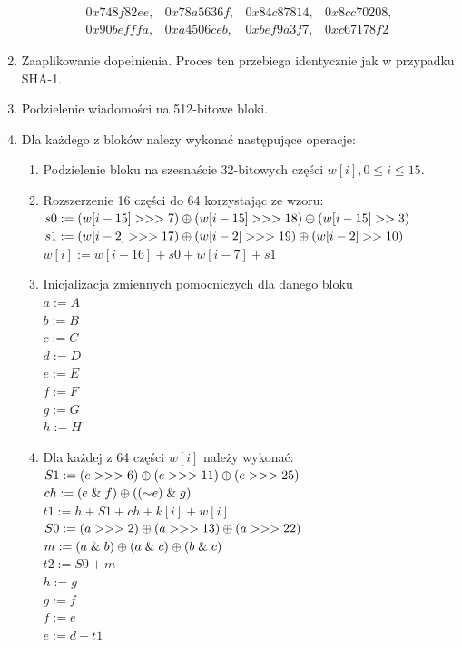 \begin{enumerate}
$$\begin{matrix}
				0x748f82ee, & 0x78a5636f, & 0x84c87814, & 0x8cc70208, \\
				0x90befffa, & 0xa4506ceb, & 0xbef9a3f7, & 0xc67178f2  	
			\end{matrix}
			$$
	\item Zaaplikowanie dopełnienia. Proces ten przebiega identycznie jak w przypadku SHA-1.
	\item Podzielenie wiadomości na 512-bitowe bloki.
	\item Dla każdego z bloków należy wykonać następujące operacje:
		\begin{enumerate}
			\item Podzielenie bloku na szesnaście 32-bitowych części $w[i], 0 \leq i \leq 15$.
			\item Rozszerzenie 16 części do 64 korzystając ze wzoru: \\
				$s0 := (w[i-15] >>> 7) \mathbin{\oplus} (w[i-15] >>> 18) \mathbin{\oplus} (w[i-15] >> 3)$ \\
			    $s1 := (w[i-2] >>> 17) \mathbin{\oplus} (w[i-2] >>> 19) \mathbin{\oplus} (w[i-2] >> 10)$ \\
				$w[i] := w[i-16] + s0 + w[i-7] + s1$
			\item Inicjalizacja zmiennych pomocniczych dla danego bloku \\
				$a := A$ \\
				$b := B$ \\
				$c := C$ \\
				$d := D$ \\
				$e := E$ \\
				$f := F$ \\
				$g := G$ \\
				$h := H$
			\item Dla każdej z 64 części $w[i]$ należy wykonać: \\
				$S1 := (e >>> 6) \mathbin{\oplus} (e >>> 11) \mathbin{\oplus} (e >>> 25)$ \\
		        $ch := (e \mathrel{\&} f) \mathbin{\oplus} ((\mathord{\sim} e) \mathrel{\&} g)$ \\
		        $t1 := h + S1 + ch + k[i] + w[i]$ \\
		        $S0 := (a >>> 2) \mathbin{\oplus} (a >>> 13) \mathbin{\oplus} (a >>> 22)$ \\
		        $m := (a \mathrel{\&} b) \mathbin{\oplus} (a \mathrel{\&} c) \mathbin{\oplus} (b \mathrel{\&} c)$ \\
		        $t2 := S0 + m$ \\
		        $h := g$ \\
		        $g := f$ \\
		        $f := e$ \\
		        $e := d + t1$ \\

\end{enumerate}
\end{enumerate}
